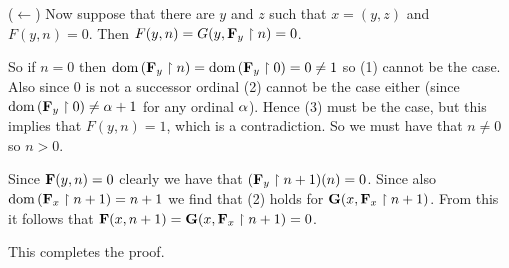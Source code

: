 {{    ($\leftarrow$) Now suppose that there are $y$ and $z$ such that $x = (y,z)$ and $F(y,n) = 0$.
    Then $F(y,n) = G(y, \mathbf{F}_y \restriction n) = 0$.

    So if $n=0$ then $\mathrm{dom}\,(\mathbf{F}_y \restriction n) = \mathrm{dom}\,(\mathbf{F}_y \restriction 0) = 0 \neq 1$ so (1) cannot be the case.
    Also since $0$ is not a successor ordinal (2) cannot be the case either (since $\mathrm{dom}\,(\mathbf{F}_y \restriction 0) \neq \alpha+1$ for any ordinal $\alpha$).
    Hence (3) must be the case, but this implies that $F(y,n) = 1$, which is a contradiction.
    So we must have that $n \neq 0$ so $n > 0$.

    Since $\mathbf{F}(y, n) = 0$ clearly we have that $(\mathbf{F}_y \restriction n+1)(n) = 0$.
    Since also $\mathrm{dom}\,(\mathbf{F}_x \restriction n+1) = n+1$ we find that (2) holds for $\mathbf{G}(x, \mathbf{F}_x \restriction n+1)$.
    From this it follows that $\mathbf{F}(x,n+1) = \mathbf{G}(x, \mathbf{F}_x \restriction n+1) = 0$.

    This completes the proof.
  }
}
